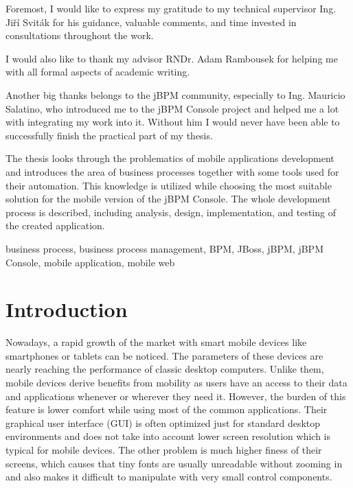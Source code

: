 \documentclass[12pt,oneside,final]{fithesis2}
\begin{document}
\FrontMatter
\ThesisTitlePage

\begin{ThesisDeclaration}
\DeclarationText
\AdvisorName
\end{ThesisDeclaration}

\begin{ThesisThanks}
Foremost, I would like to express my gratitude to my technical supervisor Ing. Jiří Sviták for his guidance, valuable comments, and time invested in consultations throughout the work.

I would also like to thank my advisor RNDr. Adam Rambousek for helping me with all formal aspects of academic writing.

Another big thanks belongs to the jBPM community, especially to Ing. Mauricio Salatino, who introduced me to the jBPM Console project and helped me a lot with integrating my work into it.
Without him I would never have been able to successfully finish the practical part of my thesis.
\end{ThesisThanks}

\begin{ThesisAbstract}
The thesis looks through the problematics of mobile applications development and introduces the area of business processes together with some tools used for their automation.
This knowledge is utilized while choosing the most suitable solution for the mobile version of the jBPM Console.
The whole development process is described, including analysis, design, implementation, and testing of the created application.
\end{ThesisAbstract}

\begin{ThesisKeyWords}
business process, business process management, BPM, JBoss, jBPM, jBPM Console, mobile application, mobile web
\end{ThesisKeyWords}

\tableofcontents

\MainMatter
\chapter{Introduction}
Nowadays, a rapid growth of the market with smart mobile devices like smartphones or tablets can be noticed.
The parameters of these devices are nearly reaching the performance of classic desktop computers.
Unlike them, mobile devices derive benefits from mobility as users have an access to their data and applications whenever or wherever they need it.
However, the burden of this feature is lower comfort while using most of the common applications.
Their graphical user interface (GUI) is often optimized just for standard desktop environments and does not take into account lower screen resolution which is typical for mobile devices.
The other problem is much higher finess of their screens, which causes that tiny fonts are usually unreadable without zooming in and also makes it difficult to manipulate with very small control components.
\end{document}
